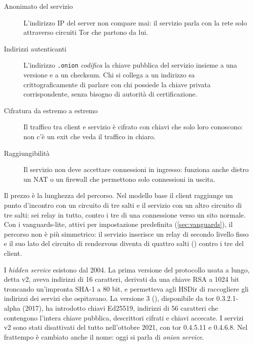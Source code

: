 \begin{description}
  \item[Anonimato del servizio] L'indirizzo IP del server non compare mai: il servizio parla con la rete solo attraverso circuiti Tor che partono da lui.
  \item[Indirizzi autenticanti] L'indirizzo \texttt{.onion} \emph{codifica} la chiave pubblica del servizio insieme a una versione e a un checksum. Chi si collega a un indirizzo sa crittograficamente di parlare con chi possiede la chiave privata corrispondente, senza bisogno di autorità di certificazione.
  \item[Cifratura da estremo a estremo] Il traffico tra client e servizio è cifrato con chiavi che solo loro conoscono: non c'è un exit che veda il traffico in chiaro.
  \item[Raggiungibilità] Il servizio non deve accettare connessioni in ingresso: funziona anche dietro un NAT o un firewall che permettono solo connessioni in uscita.
\end{description}

Il prezzo è la lunghezza del percorso. Nel modello base il client raggiunge un punto d'incontro con un circuito di tre salti e il servizio con un altro circuito di tre salti: sei relay in tutto, contro i tre di una connessione verso un sito normale. Con i vanguards-lite, attivi per impostazione predefinita (\cref{sec:vanguards}), il percorso non è più simmetrico: il servizio inserisce un relay di secondo livello fisso e il suo lato del circuito di rendezvous diventa di quattro salti () contro i tre del client.

\begin{storia}[Da v2 a v3]
I \emph{hidden service} esistono dal 2004. La prima versione del protocollo usata a lungo, detta v2, aveva indirizzi di 16 caratteri, derivati da una chiave RSA a 1024 bit troncando un'impronta SHA-1 a 80 bit, e permetteva agli HSDir di raccogliere gli indirizzi dei servizi che ospitavano. La versione 3 (), disponibile da tor 0.3.2.1-alpha (2017), ha introdotto chiavi Ed25519, indirizzi di 56 caratteri che contengono l'intera chiave pubblica, descrittori cifrati e chiavi accecate. I servizi v2 sono stati disattivati del tutto nell'ottobre 2021, con tor 0.4.5.11 e 0.4.6.8. Nel frattempo è cambiato anche il nome: oggi si parla di \emph{onion service}.
\end{storia}

